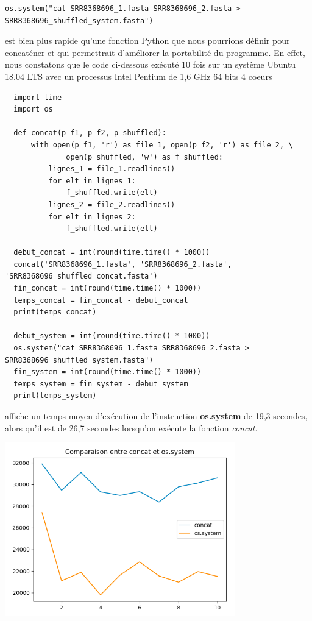 \documentclass[twoside,a4paper,11pt,frenchb,openany]{report}
\begin{document}
\begin{verbatim}os.system("cat SRR8368696_1.fasta SRR8368696_2.fasta > SRR8368696_shuffled_system.fasta")\end{verbatim}

est bien plus rapide qu'une fonction Python que nous pourrions définir pour concaténer et qui permettrait d'améliorer la portabilité du programme. En effet, nous constatons que le code ci-dessous exécuté 10 fois sur un système Ubuntu 18.04 LTS avec un processus Intel Pentium de 1,6 GHz 64 bits 4 coeurs

\begin{verbatim}
  import time
  import os

  def concat(p_f1, p_f2, p_shuffled):
      with open(p_f1, 'r') as file_1, open(p_f2, 'r') as file_2, \
              open(p_shuffled, 'w') as f_shuffled:
          lignes_1 = file_1.readlines()
          for elt in lignes_1:
              f_shuffled.write(elt)
          lignes_2 = file_2.readlines()
          for elt in lignes_2:
              f_shuffled.write(elt)

  debut_concat = int(round(time.time() * 1000))
  concat('SRR8368696_1.fasta', 'SRR8368696_2.fasta', 'SRR8368696_shuffled_concat.fasta')
  fin_concat = int(round(time.time() * 1000))
  temps_concat = fin_concat - debut_concat
  print(temps_concat)

  debut_system = int(round(time.time() * 1000))
  os.system("cat SRR8368696_1.fasta SRR8368696_2.fasta > SRR8368696_shuffled_system.fasta")
  fin_system = int(round(time.time() * 1000))
  temps_system = fin_system - debut_system
  print(temps_system)
\end{verbatim}

affiche un temps moyen d'exécution de l'instruction \textbf{os.system} de 19,3 secondes, alors qu'il est de 26,7 secondes lorsqu'on exécute la fonction \textit{concat}.

\includegraphics[width=10cm]{comparaison_concat.png}
\end{document}

